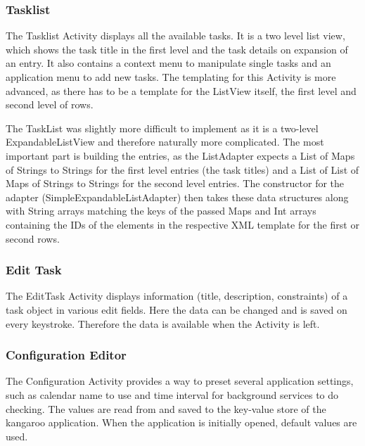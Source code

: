 
\subsubsection{Tasklist} %
\label{ssub:Tasklist}
The Tasklist Activity displays all the available tasks. It is a two level
list view, which shows the task title in the first level and the task details
on expansion of an entry. It also contains a context menu to manipulate single
tasks and an application menu to add new tasks. The templating for this
Activity is more advanced, as there has to be a template for the ListView
itself, the first level and second level of rows.

The TaskList was slightly more difficult to implement as it is a two-level
ExpandableListView and therefore naturally more complicated. The most important
part is building the entries, as the ListAdapter expects a List of Maps of
Strings to Strings for the first level entries (the task titles) and a List
of List of Maps of Strings to Strings for the second level entries. The
constructor for the adapter (SimpleExpandableListAdapter) then takes these
data structures along with String arrays matching the keys of the passed Maps
and Int arrays containing the IDs of the elements in the respective XML
template for the first or second rows.


\subsubsection{Edit Task} %
\label{ssub:EditTask}
The EditTask Activity displays information (title, description, constraints)
of a task object in various edit fields. Here the data can be changed and
is saved on every keystroke. Therefore the data is available when the
Activity is left.


\subsubsection{Configuration Editor} %
\label{ssub:ConfigurationEditor}
The Configuration Activity provides a way to preset several application
settings, such as calendar name to use and time interval for background
services to do checking. The values are read from and saved to the key-value store 
of the kangaroo application. When the application is initially opened, default values 
are used. 

